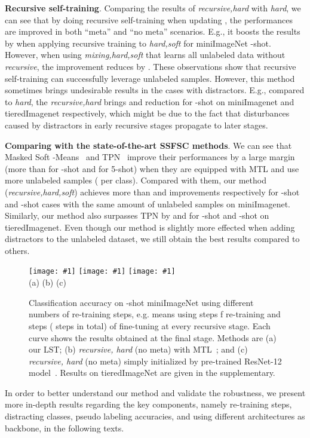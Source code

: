 \documentclass{article}
\newcommand{\myparagraph}[1]{\vspace{0.1em}\noindent\textbf{#1}}
\begin{document}
\myparagraph{Recursive self-training}. Comparing the results of \emph{recursive,hard} with \emph{hard}, we can see that by doing recursive self-training when updating , the performances are improved in both ``meta'' and ``no meta'' scenarios. E.g., it boosts the results by  when applying recursive training to \emph{hard,soft} for miniImageNet -shot. 
However, when using \emph{mixing,hard,soft} that learns all unlabeled data without \emph{recursive}, the improvement reduces by .
These observations show that recursive self-training can successfully leverage unlabeled samples. 
However, this method sometimes brings undesirable results in the cases with distractors. E.g., compared to \emph{hard}, the \emph{recursive,hard} brings  and  reduction for -shot on miniImagenet and tieredImagenet respectively, which might be due to the fact that disturbances caused by distractors in early recursive stages propagate to later stages. 

\myparagraph{Comparing with the state-of-the-art SSFSC methods}. We can see that Masked Soft -Means~\cite{RenICLR2018_semisupervised} and TPN~\cite{LiuICLR2019transductive} improve their performances by a large margin (more than  for -shot and  for 5-shot) when they are equipped with MTL and use more unlabeled samples ( per class). Compared with them, our method (\emph{recursive,hard,soft}) achieves more than  and  improvements respectively for -shot and -shot cases with the same amount of unlabeled samples on miniImagenet. Similarly, our method also surpasses TPN by  and  for -shot and -shot on tieredImagenet. 
Even though our method is slightly more effected when adding distractors to the unlabeled dataset, we still obtain the best results compared to others.


\begin{figure}
\newcommand{\plotexpone}[1]{\texttt{[image: \#1]}}
\plotexpone{plots/figure3a.eps}
\plotexpone{plots/figure3b.eps}
\plotexpone{plots/figure3c.eps}\\
\hspace*{2.31cm} (a) \hspace{4.18cm}(b) \hspace{4.18cm}(c)\\
\vspace{-0.5cm}
\caption{Classification accuracy on -shot miniImageNet using different numbers of re-training steps, e.g.  means using  steps f re-training and  steps ( steps in total) of fine-tuning at every recursive stage. 
Each curve shows the results obtained at the final stage. Methods are (a) our LST; (b) \emph{recursive, hard} (no meta) with MTL~\cite{SunCVPR2019}; and (c) \emph{recursive, hard} (no meta) simply initialized by pre-trained ResNet-12 model~\cite{SunCVPR2019}. Results on tieredImageNet are given in the supplementary.
}
\vspace{-0.5cm}
\label{plot_experiment}
\end{figure} 
In order to better understand our method and validate the robustness, we present more in-depth results regarding the key components, namely re-training steps, distracting classes, pseudo labeling accuracies, and using different architectures as backbone, in the following texts.
\end{document}
